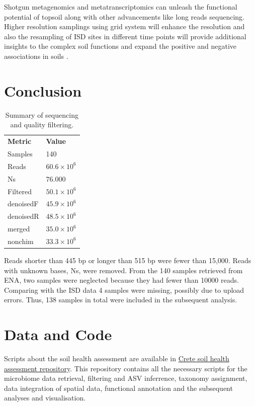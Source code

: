 \documentclass[a4paper,12pt]{article}
\begin{document}
Shotgun metagenomics and metatranscriptomics can unleash the functional potential of
topsoil along with other advancements like long reads sequencing. Higher resolution
samplings using grid system will enhance the resolution and also the resampling of
ISD sites in different time points will provide additional insights to the complex soil 
functions and expand the positive and negative associations in soils \parencite{Liu2024}.

\section{Conclusion}



\begin{table}[h!]
\centering
\caption{Summary of sequencing and quality filtering.}
\begin{tabular}{@{}ll@{}}
\textbf{Metric} & \textbf{Value}     \\
Samples         & 140                \\
Reads           & $60.6 \times 10^6$ \\
Ns              & $76.000$           \\
Filtered        & $50.1 \times 10^6$ \\
denoisedF       & $45.9 \times 10^6$ \\
denoisedR       & $48.5 \times 10^6$ \\
merged          & $35.0 \times 10^6$ \\
nonchim         & $33.3 \times 10^6$ \\
\end{tabular}
\label{tab:metrics}
\end{table}

Reads shorter than 445 bp or longer than 515 bp were fewer than
15,000.
Reads with unknown bases, Ns, were removed.
From the 140 samples retrieved from ENA, two samples were 
neglected because they had fewer than 10000 reads. Comparing with the ISD data
4 samples were missing, possibly due to upload errors.
Thus, 138 samples in total were included in the subsequent analysis.



\section{Data and Code}
Scripts about the soil health assessment are available in 
\href{https://github.com/savvas-paragkamian/crete-soil-health.git}{Crete soil health assessment repository}.
This repository contains all the necessary scripts for the microbiome data retrieval,
filtering and ASV inferrence, taxonomy assignment, data integration of spatial data, 
functional annotation and the subsequent analyses and visualisation.
\end{document}
